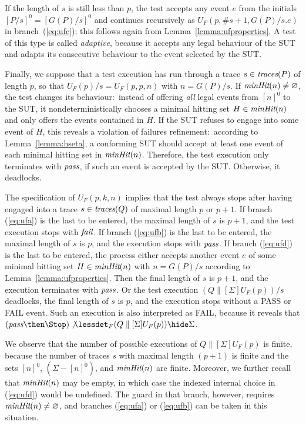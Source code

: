 If the length of $s$ is still less than $p$, the test accepts any event $e$
from the initials $[P/s]^0 = [G(P)/s]^0$ and continues recursively as
$U_F(p,\#s+1,G(P)/s.e)$ in branch~(\ref{eq:ufc}); this follows again from
Lemma~\ref{lemma:ufproperties}. A test of this type is called
\emph{adaptive}, because it accepts any legal behaviour of the SUT and adapts
its consecutive behaviour to the event selected by the SUT.

Finally, we suppose that a test execution has run through a trace
$s\in\text{\it traces}(P)$ of length $p$, so that $U_F(p)/s = U_F(p,p,n)$ with $n =
G(P)/s$. If $\text{\it minHit}(n)\neq \varnothing$, the test changes its
behaviour:~instead of offering {\it all} legal events from $[n]^0$ to the
SUT, it nondeterministically chooses a minimal hitting set $H\in \text{\it minHit}(n)$
and only offers the events contained in $H$. If the SUT refuses to engage
into some event of $H$, this reveals a violation of failures
refinement:~according to Lemma~\ref{lemma:hseta}, a conforming SUT should
accept at least one event of each minimal hitting set in $\text{\it minHit}(n)$.
Therefore, the test execution only terminates with  ${\text{\it pass}}$, if such an
event is accepted by the SUT. Otherwise, it deadlocks.

The specification of $U_F(p,k,n)$ implies that the test always stops after
having engaged into a trace $s\in\text{\it traces}(Q)$ of maximal length $p$ or $p+1$. If
branch (\ref{eq:ufa}) is the last to be entered, the maximal length of $s$ is
$p+1$, and the test execution stops with ${\text{\it fail}}$. If branch (\ref{eq:ufb})
is the last to be entered, the maximal length of $s$ is $p$, and the
execution stops with ${\text{\it pass}}$. If branch (\ref{eq:ufd}) is the last to be
entered, the process either accepts another event $e$ of some minimal hitting
set $H\in\text{\it minHit}(n)$ with $n = G(P)/s$ according to
Lemma~\ref{lemma:ufproperties}. Then the final length of $s$ is $p+1$, and
the execution terminates with ${\text{\it pass}}$. Or the test execution
$(Q\parallel[\Sigma] U_F(p))/s$ deadlocks,  the final length of $s$ is $p$,
and the execution stops without a PASS or FAIL event. Such an execution is
also interpreted as FAIL, because it reveals that $(\epass\then\Stop)
\not\lessdet_F (Q\parallel[\Sigma] U_F(p)) \hide \Sigma$.

We observe that the number of possible executions of $Q\parallel[\Sigma]
U_F(p)$ is finite, because the number of traces $s$ with maximal length
$(p+1)$ is finite and the sets $[n]^0$, $(\Sigma - [n]^0)$, and $\text{\it minHit}(n)$
are finite. Moreover, we further recall that $\text{\it minHit}(n)$ may be empty, in
which case the indexed internal choice in (\ref{eq:ufd}) would be undefined.
The guard in that branch, however, requires $\text{\it minHit}(n)\neq\varnothing$, and
branches (\ref{eq:ufa}) or (\ref{eq:ufb}) can be taken in this situation.

